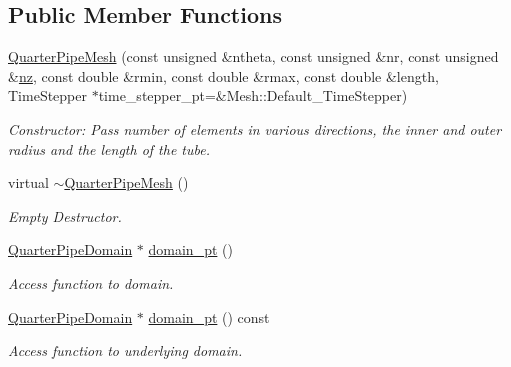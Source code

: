 \subsection*{Public Member Functions}
\begin{DoxyCompactItemize}
\item 
\hyperlink{classoomph_1_1QuarterPipeMesh_a453b84a80ccde867b8526e538135f43b}{Quarter\+Pipe\+Mesh} (const unsigned \&ntheta, const unsigned \&nr, const unsigned \&\hyperlink{classoomph_1_1SimpleCubicMesh_ad78725440e4e87598fd9339653b28e61}{nz}, const double \&rmin, const double \&rmax, const double \&length, Time\+Stepper $\ast$time\+\_\+stepper\+\_\+pt=\&Mesh\+::\+Default\+\_\+\+Time\+Stepper)
\begin{DoxyCompactList}\small\item\em Constructor\+: Pass number of elements in various directions, the inner and outer radius and the length of the tube. \end{DoxyCompactList}\item 
virtual \hyperlink{classoomph_1_1QuarterPipeMesh_a591e2d48bd5783bb390093a18c066ffc}{$\sim$\+Quarter\+Pipe\+Mesh} ()
\begin{DoxyCompactList}\small\item\em Empty Destructor. \end{DoxyCompactList}\item 
\hyperlink{classoomph_1_1QuarterPipeDomain}{Quarter\+Pipe\+Domain} $\ast$ \hyperlink{classoomph_1_1QuarterPipeMesh_a9a1bce41d07ab1bdb8f83e77f59c4a1b}{domain\+\_\+pt} ()
\begin{DoxyCompactList}\small\item\em Access function to domain. \end{DoxyCompactList}\item 
\hyperlink{classoomph_1_1QuarterPipeDomain}{Quarter\+Pipe\+Domain} $\ast$ \hyperlink{classoomph_1_1QuarterPipeMesh_ade9c9f2cbf3c9e722a480e7a056d4c63}{domain\+\_\+pt} () const
\begin{DoxyCompactList}\small\item\em Access function to underlying domain. \end{DoxyCompactList}\end{DoxyCompactItemize}
